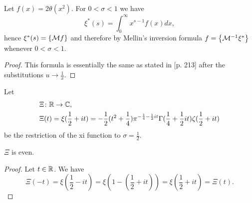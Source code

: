 \begin{lemma}\label{lem:XiMellin}
	Let $f(x) = 2 \theta(x^2)$. For $0 < \sigma < 1$ we have
\begin{equation*}
	\xi^*(s) = \int _0 ^\infty x^{s - 1} f(x) dx,
\end{equation*}
	hence $\xi^*(s) = \left\{\mathcal{M} f\right\}$ and therefore by Mellin's inversion formula $f = \left\{\mathcal{M}^{-1} \xi^*\right\}$ whenever $0 < \sigma < 1$.
\end{lemma}
\begin{proof}
	This formula is essentially the same as stated in \cite{Edwards1974} [p. 213] after the substitutions $u \to \frac{1}{x}$.
\end{proof}


\begin{definition}
	Let
\begin{equation*}
\begin{aligned}
	&\Xi \colon \mathbb{R} \to \mathbb{C}, \\
	&\Xi(t) = \xi(\frac{1}{2} + it) = -\frac{1}{2}(t^2 + \frac{1}{4}) \pi ^{-\frac{1}{4} - \frac{1}{2} it} \Gamma(\frac{1}{4} + \frac{1}{2} it) \zeta(\frac{1}{2} + it)
\end{aligned}
\end{equation*}
	be the restriction of the xi function to $\sigma = \frac{1}{2}$.
\end{definition}


\begin{lemma}
	$\Xi$ is even.
\end{lemma}
\begin{proof}
	Let $t \in \mathbb{R}$. We have
\begin{equation*}
	\Xi(-t) = \xi(\frac{1}{2} - it) = \xi(1 - (\frac{1}{2} + it)) = \xi(\frac{1}{2} + it) = \Xi(t).
\end{equation*}
\end{proof}


